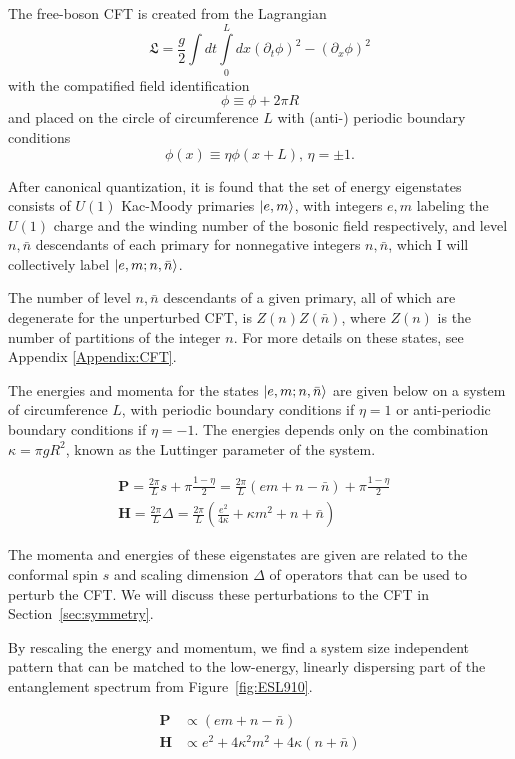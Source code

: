 The free-boson CFT is created from the Lagrangian
$$ \mathfrak{L} = \frac{g}{2}\int dt \int\limits_0^L dx (\partial_t \phi)^2 - (\partial_x \phi)^2$$
with the compatified field identification
$$ \phi \equiv \phi + 2\pi R$$
and placed on the circle of circumference $L$ with (anti-) periodic boundary conditions
$$ \phi(x) \equiv \eta \phi(x+L), \, \eta=\pm 1.$$


After canonical quantization, it is found that the set of energy
eigenstates consists of $U(1)$ Kac-Moody primaries $\vert e, m \rangle$, with
integers $e, m$ labeling the $U(1)$ charge and the winding number of
the bosonic field respectively, and level $n, \bar{n}$ descendants of each primary for
nonnegative integers $n,\bar{n}$,
which I will collectively label $\vert e, m; n, \bar{n} \rangle$.
 
The number of level $n, \bar{n}$ descendants of a given
primary, all of which are degenerate for the unperturbed CFT, is $Z(n) Z(\bar{n})$, where
$Z(n)$ is the number of partitions of the integer $n$. 
For more details on these states, see Appendix \ref{Appendix:CFT}.

The energies and momenta for the states $\vert e, m; n, \bar{n} \rangle$ are given below
on a system of circumference $L$, with periodic boundary conditions if $\eta=1$
or anti-periodic boundary conditions if $\eta=-1$.
The energies depends only on the combination $\kappa = \pi g R^2$,
known as the Luttinger parameter of the system. \cite{giamarchi} 

\begin{align*}
	\mathbf{P} =\frac{2\pi}{L} s + \pi \frac{1-\eta}{2} 
	= \frac{2\pi}{L}(em + n - \bar{n})+ \pi \frac{1-\eta}{2}&  \\
	\mathbf{H} = \frac{2\pi}{L}\Delta
	= \frac{2\pi}{L}(\frac{e^2}{4\kappa} + \kappa m^2 + n + \bar{n})& %
\end{align*}

The momenta and energies of these eigenstates are given are related to the conformal
spin $s$ and scaling dimension $\Delta$ of operators that can be used to perturb the CFT.
We will discuss these perturbations to the CFT in Section~\ref{sec:symmetry}.

By rescaling the energy and momentum, we find a system size
independent pattern that can be matched to the low-energy, linearly
dispersing part of the entanglement spectrum from Figure~\ref{fig:ESL910}.

\begin{align*}
\mathbf{P} &\propto (em + n - \bar{n}) \\
\mathbf{H} &\propto e^2 + 4\kappa^2 m^2 + 4\kappa(n + \bar{n})
\end{align*}

